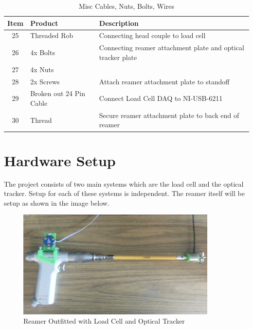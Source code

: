 \documentclass[pdftex,11pt,letterpaper]{article}
\begin{document}
\begin{table}[h!]
\begin{center}
    \begin{tabular}{ | c | l | l |}
    \hline
    Item & Product &  Description \\ \hline
    25 & Threaded Rob & Connecting head couple to load cell \\ \hline
    26 & 4x Bolts & Connecting reamer attachment plate and optical tracker plate \\ \hline
    27 & 4x Nuts & \\ \hline
    28 & 2x Screws & Attach reamer attachment plate to standoff \\ \hline
    29 & Broken out 24 Pin Cable & Connect Load Cell DAQ to NI-USB-6211 \\ \hline
    30 & Thread & Secure reamer attachment plate to back end of reamer \\ \hline
	\end{tabular}
	\caption{Misc Cables, Nuts, Bolts, Wires}
\end{center}
\end{table}

\section{Hardware Setup}
The project consists of two main systems which are the load cell and the optical tracker. Setup for each of these systems is independent. The reamer itself will be setup as shown in the image below. \\

\begin{figure}[ht!]
\centering
\includegraphics[width=100mm]{./images/reamer_total}
\caption{Reamer Outfitted with Load Cell and Optical Tracker}
\label{reamer}
\end{figure}
\end{document}
